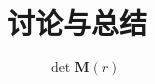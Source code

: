 \section{讨论与总结}
\label{sec:discussion}

\begin{figure}[H]
    \centering
    
    \caption{$\det \pmb{M}(r)$}
    \label{fig:det_M_r_far}
\end{figure}
